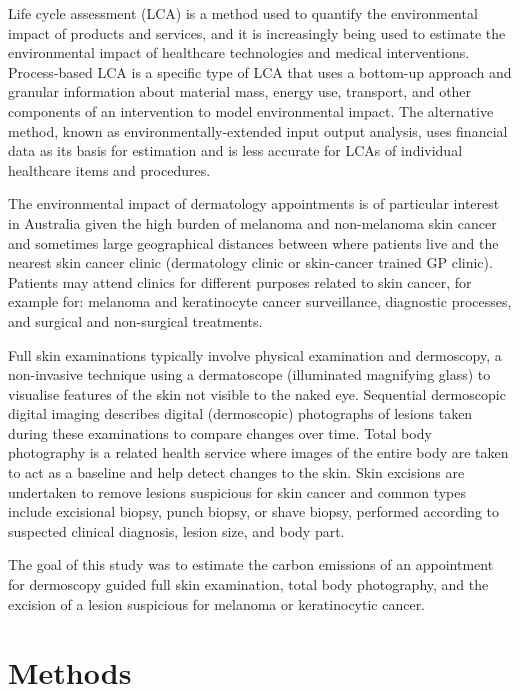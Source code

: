 \begin{refsection}
Life cycle assessment (LCA) is a method used to quantify the environmental impact of products and services, and it is increasingly being used to estimate the environmental impact of healthcare technologies and medical interventions.\cite{rasmussen_environmentally_2025, drew_healthcarelca_2025} Process-based LCA is a specific type of LCA that uses a bottom-up approach and granular information about material mass, energy use, transport, and other components of an intervention to model environmental impact. The alternative method, known as environmentally-extended input output analysis, uses financial data as its basis for estimation and is less accurate for LCAs of individual healthcare items and procedures.\cite{mcalister_how_2024}

The environmental impact of dermatology appointments is of particular interest in Australia given the high burden of melanoma and non-melanoma skin cancer and sometimes large geographical distances between where patients live and the nearest skin cancer clinic (dermatology clinic or skin-cancer trained GP clinic). Patients may attend clinics for different purposes related to skin cancer, for example for: melanoma and keratinocyte cancer surveillance, diagnostic processes, and surgical and non-surgical treatments. 

Full skin examinations typically involve physical examination and dermoscopy, a non-invasive technique using a dermatoscope (illuminated magnifying glass) to visualise features of the skin not visible to the naked eye. Sequential dermoscopic digital imaging describes digital (dermoscopic) photographs of lesions taken during these examinations to compare changes over time.\cite{adler_methods_2019} Total body photography is a related health service where images of the entire body are taken to act as a baseline and help detect changes to the skin.\cite{adler_methods_2019} Skin excisions are undertaken to remove lesions suspicious for skin cancer and common types include excisional biopsy, punch biopsy, or shave biopsy, performed according to suspected clinical diagnosis, lesion size, and body part. 

The goal of this study was to estimate the carbon emissions of an appointment for dermoscopy guided full skin examination, total body photography, and the excision of a lesion suspicious for melanoma or keratinocytic cancer. 

\section{Methods}


\end{refsection}
